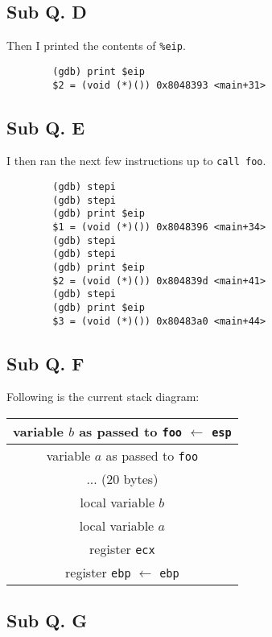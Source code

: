 \documentclass[letterpaper, 10pt]{article}
\begin{document}
	\subsection*{Sub Q. D}

	Then I printed the contents of {\tt \%eip}.

	\begin{verbatim}
		(gdb) print $eip
		$2 = (void (*)()) 0x8048393 <main+31>
	\end{verbatim}

	\subsection*{Sub Q. E}

	I then ran the next few instructions up to {\tt call foo}.

	\begin{verbatim}
		(gdb) stepi
		(gdb) stepi
		(gdb) print $eip
		$1 = (void (*)()) 0x8048396 <main+34>
		(gdb) stepi
		(gdb) stepi
		(gdb) print $eip
		$2 = (void (*)()) 0x804839d <main+41>
		(gdb) stepi
		(gdb) print $eip
		$3 = (void (*)()) 0x80483a0 <main+44>
	\end{verbatim}

	\subsection*{Sub Q. F}

	Following is the current stack diagram:

	\vspace{1em}
	\begin{tabular} { | c | }
		variable $b$ as passed to {\tt foo} $\longleftarrow$ {\tt esp} \\ \hline
		variable $a$ as passed to {\tt foo} \\ \hline
		... (20 bytes) \\ \hline
		local variable $b$ \\ \hline
		local variable $a$ \\ \hline
		register {\tt ecx} \\ \hline
		register {\tt ebp} $\longleftarrow$ {\tt ebp} \\
		\hline
	\end{tabular}

	\subsection*{Sub Q. G}
\end{document}
